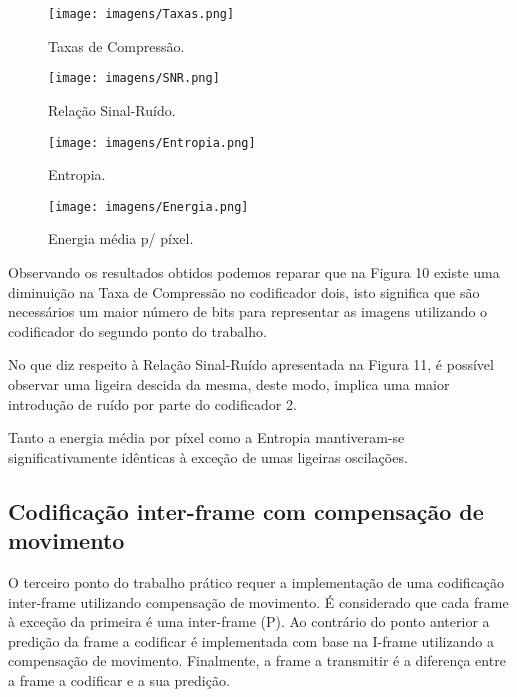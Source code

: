 \documentclass[12pt,a4paper]{article}
\begin{document}
\begin{figure}[h]
	\centering
    \begin{minipage}{0.45\textwidth}
        \centering
        \texttt{[image: imagens/Taxas.png]}
        \caption{Taxas de Compressão.}
    \end{minipage}\hfill
    \begin{minipage}{0.45\textwidth}
        \centering
        \texttt{[image: imagens/SNR.png]}
        \caption{Relação Sinal-Ruído.}
    \end{minipage}
\end{figure}
\begin{figure}[h]
	\centering
    \begin{minipage}{0.45\textwidth}
        \centering
        \texttt{[image: imagens/Entropia.png]}
        \caption{Entropia.}
    \end{minipage}\hfill
    \begin{minipage}{0.45\textwidth}
        \centering
        \texttt{[image: imagens/Energia.png]}
        \caption{Energia média p/ píxel.}
    \end{minipage}
\end{figure}

Observando os resultados obtidos podemos reparar que na Figura 10 existe uma diminuição na Taxa de Compressão no codificador dois, isto significa que são necessários um maior número de bits para representar as imagens utilizando o codificador do segundo ponto do trabalho.

No que diz respeito à Relação Sinal-Ruído apresentada na Figura 11, é possível observar uma ligeira descida da mesma, deste modo, implica uma maior introdução de ruído por parte do codificador 2. 

Tanto a energia média por píxel como a Entropia mantiveram-se significativamente idênticas à exceção de umas ligeiras oscilações.

\subsection{Codificação inter-frame com compensação de movimento}
O terceiro ponto do trabalho prático requer a implementação de uma codificação inter-frame utilizando compensação de movimento. É considerado que cada frame à exceção da primeira é uma inter-frame (P). Ao contrário do ponto anterior a predição da frame a codificar é implementada com base na I-frame utilizando a compensação de movimento. Finalmente, a frame a transmitir é a diferença entre a frame a codificar e a sua predição.
\end{document}
